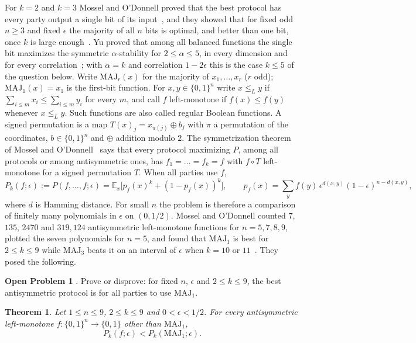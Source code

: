 \documentclass[11pt]{amsart}
\newtheorem{theorem}{Theorem}[section]
\theoremstyle{remark}
\newcommand{\E}{\mathbb{E}}
\newcommand{\MAJ}{\mathrm{MAJ}}
\begin{document}
For $k=2$ and $k=3$ Mossel and O'Donnell proved that the best protocol has every party output a single bit of its
input~\cite[Theorem~1.3]{MO05}, and they showed that for fixed odd $n\ge3$ and fixed $\epsilon$ the majority of all
$n$ bits is optimal, and better than one bit, once $k$ is large enough~\cite[Theorem~1.5]{MO05}. Yu proved that among
all balanced functions the single bit maximizes the symmetric $\alpha$-stability for $2\le\alpha\le5$, in every
dimension and for every correlation~\cite[Corollary~2]{Yu23}; with $\alpha=k$ and correlation $1-2\epsilon$ this is the
case $k\le5$ of the question below. Write $\MAJ_r(x)$ for the majority of $x_1,\dots,x_r$ ($r$ odd); $\MAJ_1(x)=x_1$
is the first-bit function. For $x,y\in\{0,1\}^n$ write $x\le_L y$ if $\sum_{i\le m}x_i\le\sum_{i\le m}y_i$ for every
$m$, and call $f$ left-monotone if $f(x)\le f(y)$ whenever $x\le_L y$. Such functions are also called
regular Boolean functions. A signed permutation is a map $T(x)_j=x_{\pi(j)}\oplus b_j$ with $\pi$ a permutation of
the coordinates, $b\in\{0,1\}^n$ and $\oplus$ addition modulo $2$. The symmetrization theorem of Mossel and O'Donnell~\cite[Theorem~1.4]{MO05} says
that every protocol maximizing $P$, among all protocols or among antisymmetric ones, has $f_1=\dots=f_k=f$ with
$f\circ T$ left-monotone for a signed permutation $T$. When all parties use $f$,
\begin{equation}\label{eq:Pk}
  P_k(f;\epsilon):=P(f,\dots,f;\epsilon)=\E_x\bigl[p_f(x)^k+(1-p_f(x))^k\bigr],\qquad
  p_f(x)=\sum_{y}f(y)\,\epsilon^{d(x,y)}(1-\epsilon)^{n-d(x,y)},
\end{equation}
where $d$ is Hamming distance. For small $n$ the problem is therefore a comparison of finitely many polynomials in
$\epsilon$ on $(0,1/2)$. Mossel and O'Donnell counted $7$, $135$, $2470$ and $319{,}124$ antisymmetric left-monotone
functions for $n=5,7,8,9$, plotted the seven polynomials for $n=5$, and found that $\MAJ_1$ is best for $2\le k\le9$
while $\MAJ_3$ beats it on an interval of $\epsilon$ when $k=10$ or $11$~\cite[Fact~5.1, Proposition~5.2]{MO05}. They
posed the following.

\medskip\noindent\textbf{Open Problem 1} \cite{MO05}. Prove or disprove: for fixed $n$, $\epsilon$ and $2\le k\le 9$,
the best antisymmetric protocol is for all parties to use $\MAJ_1$.

\begin{theorem}\label{thm:main}
Let $1\le n\le 9$, $2\le k\le 9$ and $0<\epsilon<1/2$. For every antisymmetric left-monotone $f\colon\{0,1\}^n\to\{0,1\}$
other than $\MAJ_1$,
\[
  P_k(f;\epsilon)<P_k(\MAJ_1;\epsilon).
\]
\end{theorem}
\end{document}
